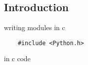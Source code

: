 
\subsection{Introduction}


writing modules in c

\begin{verbatim}
    #include <Python.h>
\end{verbatim}

in c code

